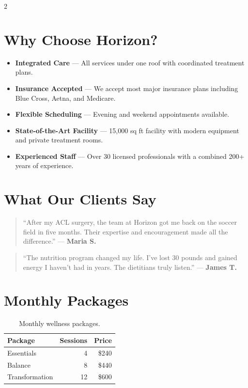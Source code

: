 \documentclass[
    language=english,
    doctype=brochure,
    institution=none,
]{../../omnilatex}
\begin{document}
\begin{multicols}{2}

\section*{Why Choose Horizon?}

\begin{itemize}[leftmargin=*, nosep]
    \item \textbf{Integrated Care} --- All services under one roof with
          coordinated treatment plans.
    \item \textbf{Insurance Accepted} --- We accept most major insurance plans
          including Blue Cross, Aetna, and Medicare.
    \item \textbf{Flexible Scheduling} --- Evening and weekend appointments
          available.
    \item \textbf{State-of-the-Art Facility} --- 15,000 sq ft facility with
          modern equipment and private treatment rooms.
    \item \textbf{Experienced Staff} --- Over 30 licensed professionals with
          a combined 200+ years of experience.
\end{itemize}

\section*{What Our Clients Say}

\begin{quote}
    \small ``After my ACL surgery, the team at Horizon got me back on the soccer
    field in five months. Their expertise and encouragement made all the
    difference.''
    \hfill --- \textbf{Maria S.}
\end{quote}

\begin{quote}
    \small ``The nutrition program changed my life. I've lost 30 pounds and
    gained energy I haven't had in years. The dietitians truly listen.''
    \hfill --- \textbf{James T.}
\end{quote}

\columnbreak

\section*{Monthly Packages}

\begin{table}[h]
    \centering
    \small
    \begin{tabular}{lrr}
        \toprule
        \textbf{Package} & \textbf{Sessions} & \textbf{Price} \\
        \midrule
        Essentials    & 4  & \$240  \\
        Balance       & 8  & \$440  \\
        Transformation & 12 & \$600 \\
        \bottomrule
    \end{tabular}
    \caption{Monthly wellness packages.}
\end{table}


\end{multicols}
\end{document}
